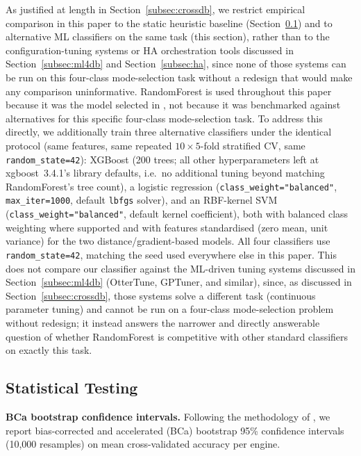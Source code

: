 \documentclass[iicol,pdflatex,sn-mathphys-num]{sn-jnl}
\theoremstyle{thmstyleone}
\theoremstyle{thmstylethree}
\begin{document}
As justified at length in Section~\ref{subsec:crossdb}, we
restrict empirical comparison in this paper to the static heuristic
baseline (Section~\ref{subsec:stats}) and to alternative ML
classifiers on the same task (this section), rather than to the
configuration-tuning systems or HA orchestration tools discussed in
Section~\ref{subsec:ml4db} and Section~\ref{subsec:ha},
since none of those systems can be run on this four-class
mode-selection task without a redesign that would make any comparison
uninformative. RandomForest is used throughout this paper because it
was the model selected in \cite{iaha2026}, not because it was
benchmarked against
alternatives for this specific four-class mode-selection task. To
address this directly, we additionally train three alternative
classifiers under the identical protocol (same features, same
repeated $10\times5$-fold stratified CV, same \texttt{random\_state=42}):
XGBoost (200 trees; all other hyperparameters left at
xgboost~3.4.1's library defaults, i.e.\ no additional tuning beyond
matching RandomForest's tree count), a logistic regression
(\texttt{class\_weight="balanced"}, \texttt{max\_iter=1000}, default
\texttt{lbfgs} solver), and an RBF-kernel SVM
(\texttt{class\_weight="balanced"}, default kernel coefficient), both
with balanced class weighting where supported
and with features standardised (zero mean, unit variance) for the
two distance/gradient-based models. All four classifiers use
\texttt{random\_state=42}, matching the seed used everywhere else in
this paper. This does not compare our
classifier against the ML-driven tuning systems discussed in
Section~\ref{subsec:ml4db} (OtterTune, GPTuner, and similar), since,
as discussed in Section~\ref{subsec:crossdb}, those systems solve a
different task (continuous parameter tuning) and cannot be run on a
four-class mode-selection problem without redesign; it instead
answers the narrower and directly answerable question of whether
RandomForest is competitive with other standard classifiers on
exactly this task.

\subsection{Statistical Testing}\label{subsec:stats}

\textbf{BCa bootstrap confidence intervals.} Following the
methodology of \cite{iaha2026}, we report bias-corrected and
accelerated (BCa) bootstrap 95\% confidence intervals (10{,}000
resamples) on mean cross-validated accuracy per engine.
\end{document}
